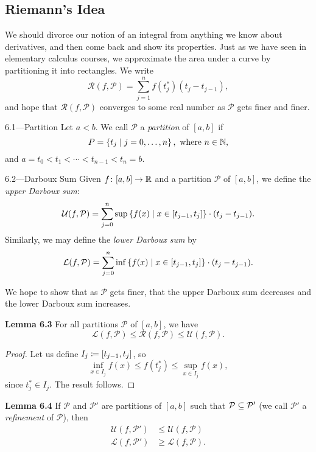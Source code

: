 \documentclass[class=article, crop=false]{standalone}
\begin{document}
  \subsection{Riemann's Idea}
  We should divorce our notion of an integral from anything we know about derivatives, and then come back and show its properties. Just as we have seen in elementary calculus courses, we approximate the area under a curve by partitioning it into rectangles. We write
  \[
    \mathcal{R}(f, \mathcal{P}) = \sum_{j=1}^{n} f(t_j^*)(t_j - t_{j - 1}),
  \]
  and hope that $\mathcal{R}(f, \mathcal{P})$ converges to some real number as $\mathcal{P}$ gets finer and finer.
  \begin{definition}{6.1---Partition}
    Let $a < b$. We call $\mathcal{P}$ a \emph{partition} of $[a, b]$ if
    \[
      P = \left\{t_j\mid j = 0,\dotsc,n\right\},\text{ where }n\in\mathbb{N},
    \]
    and $a = t_0 < t_1 < \dotsb < t_{n - 1} < t_n = b$.
  \end{definition}
  \begin{definition}{6.2---Darboux Sum}
    Given $f\colon [a, b]\to \mathbb{R}$ and a partition $\mathcal{P}$ of $[a, b]$, we define the \emph{upper Darboux sum}:
    \[
      \mathcal{U}(f, \mathcal{P}) = \sum_{j=0}^{n} \sup \left\{f(x)\mid x\in [t_{j - 1}, t_j]\right\}\cdot (t_j - t_{j - 1}).
    \]
    Similarly, we may define the \emph{lower Darboux sum} by
    \[
      \mathcal{L}(f, \mathcal{P}) = \sum_{j=0}^{n} \inf \left\{f(x)\mid x\in [t_{j - 1}, t_j]\right\}\cdot (t_j - t_{j - 1}).
    \]
  \end{definition}
  We hope to show that as $\mathcal{P}$ gets finer, that the upper Darboux sum decreases and the lower Darboux sum increases. \par
  \textbf{Lemma 6.3} For all partitions $\mathcal{P}$ of $[a, b]$, we have
  \[
    \mathcal{L}(f, \mathcal{P})\leq \mathcal{R}(f, \mathcal{P})\leq \mathcal{U}(f, \mathcal{P}).
  \]
  \begin{proof}
    Let us define $I_j\coloneqq [t_{j - 1}, t_j]$, so
    \[
      \inf_{x\in I_j} f(x)\leq f(t_j^*)\leq \sup_{x\in I_j}f(x),
    \]
    since $t_j^*\in I_j$. The result follows.
  \end{proof}
  \textbf{Lemma 6.4} If $\mathcal{P}$ and $\mathcal{P}'$ are partitions of $[a, b]$ such that $\mathcal{P}\subseteq \mathcal{P}'$ (we call $\mathcal{P}'$ a \emph{refinement} of $\mathcal{P}$), then
  \begin{align*}
    \mathcal{U}(f, \mathcal{P}')&\leq \mathcal{U}(f, \mathcal{P}) \\
    \mathcal{L}(f, \mathcal{P}')&\geq \mathcal{L}(f, \mathcal{P}).
  \end{align*}
\end{document}
